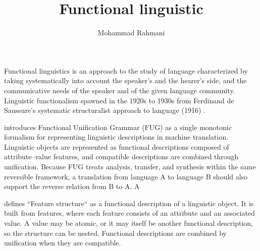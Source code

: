 \documentclass[a4paper]{article}
\title{Functional linguistic}
\date{}
\author{Mohammad Rahmani}
\begin{document}
    \maketitle
    Functional linguistics is an approach to the study of language characterized by taking systematically into account the speaker's and the hearer's side, and the communicative needs of the speaker and of the given language community. Linguistic functionalism spawned in the 1920s to 1930s from Ferdinand de Saussure's systematic structuralist approach to language (1916) .
    
    \cite{kay-1984-functional-unification-grammar} introduces Functional Unification Grammar (FUG) as a single monotonic formalism for representing linguistic descriptions in machine translation. Linguistic objects are represented as functional descriptions composed of attribute--value features, and compatible descriptions are combined through unification. Because FUG treats analysis, transfer, and synthesis within the same reversible framework, a translation from language A to language B should also support the reverse relation from B to A. A
    
    \cite{kay-1984-functional-unification-grammar} defines ``Feature structure`` as a functional description of a linguistic object. It is built from features, where each feature consists of an attribute and an associated value. A value may be atomic, or it may itself be another functional description, so the structure can be nested. Functional descriptions are combined by unification when they are compatible.
    
    
\end{document}
